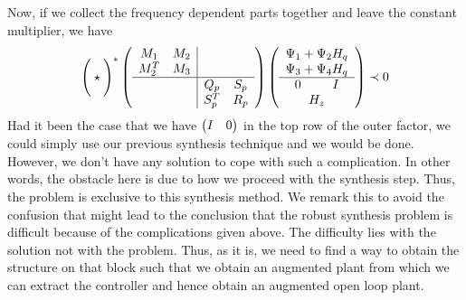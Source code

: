 Now, if we collect the frequency dependent parts together and leave the constant multiplier, we have 
\[
\Bigg(\star\Bigg)^*
\left(
\begin{array}{cc|cc}
M_1&M_2&&\\M^T_2&M_3&&\\\hline &&Q_p&S_p\\&&S_p^T&R_p
\end{array}
\right)
\left(
\begin{array}{>{\centering\arraybackslash$} p{0.7cm} <{$}>{\centering\arraybackslash$} p{0.7cm} <{$}}
	\multicolumn{2}{c}{\Psi_1 + \Psi_2H_q}\\
	\multicolumn{2}{c}{\Psi_3 + \Psi_4H_q}\\\hline
	0& I\\
	\multicolumn{2}{c}{H_z}
\end{array}
\right)
\prec 0
\]
Had it been the case that we have $\begin{pmatrix}I &0\end{pmatrix}$ in the top row of the outer factor, we could simply use our previous 
synthesis technique and we would be done. However, we don't have any solution to cope with such a complication. In other 
words, the obstacle here is due to how we proceed with the synthesis step. Thus, the problem is exclusive to this synthesis method.
We remark this to avoid the confusion that might lead to the conclusion that the robust synthesis problem is difficult because of the 
complications given above. The difficulty lies with the solution not with the problem. Thus, as it is, we need to find a way to obtain 
the structure on that block such that we obtain an augmented plant from which we can extract the controller and hence obtain an 
augmented open loop plant.


